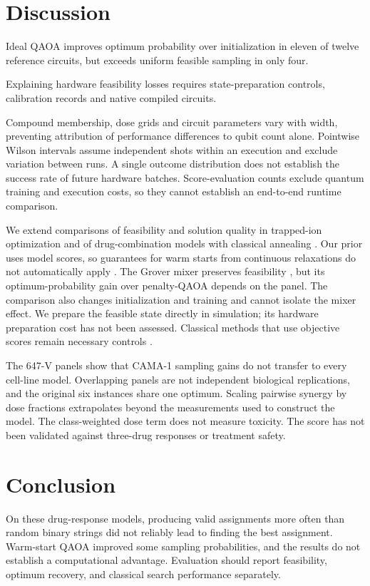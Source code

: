 \documentclass[utf8]{FrontiersinHarvard}
\begin{document}
\section{Discussion}
Ideal QAOA improves optimum probability over initialization in eleven of twelve reference circuits, but exceeds uniform feasible sampling in only four.

Explaining hardware feasibility losses requires state-preparation controls, calibration records and native compiled circuits.

Compound membership, dose grids and circuit parameters vary with width, preventing attribution of performance differences to qubit count alone. Pointwise Wilson intervals assume independent shots within an execution and exclude variation between runs. A single outcome distribution does not establish the success rate of future hardware batches. Score-evaluation counts exclude quantum training and execution costs, so they cannot establish an end-to-end runtime comparison.

We extend comparisons of feasibility and solution quality in trapped-ion optimization \citep{niroula2022} and of drug-combination models with classical annealing \citep{ramos2026}. Our prior uses model scores, so guarantees for warm starts from continuous relaxations do not automatically apply \citep{egger2021}. The Grover mixer preserves feasibility \citep{hadfield2019,bartschi2020}, but its optimum-probability gain over penalty-QAOA depends on the panel. The comparison also changes initialization and training and cannot isolate the mixer effect. We prepare the feasible state directly in simulation; its hardware preparation cost has not been assessed. Classical methods that use objective scores remain necessary controls \citep{koch2026}.

The 647-V panels show that CAMA-1 sampling gains do not transfer to every cell-line model. Overlapping panels are not independent biological replications, and the original six instances share one optimum. Scaling pairwise synergy by dose fractions extrapolates beyond the measurements used to construct the model. The class-weighted dose term does not measure toxicity. The score has not been validated against three-drug responses or treatment safety.

\section{Conclusion}
On these drug-response models, producing valid assignments more often than random binary strings did not reliably lead to finding the best assignment. Warm-start QAOA improved some sampling probabilities, and the results do not establish a computational advantage. Evaluation should report feasibility, optimum recovery, and classical search performance separately.
\end{document}
